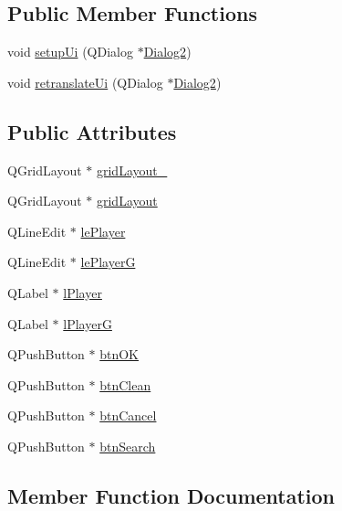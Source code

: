 \subsection*{Public Member Functions}
\begin{DoxyCompactItemize}
\item 
void \hyperlink{class_ui___dialog2_a6844bf81dbbb01d6eb47136862dccaa8}{setup\+Ui} (Q\+Dialog $\ast$\hyperlink{class_dialog2}{Dialog2})
\item 
void \hyperlink{class_ui___dialog2_a26d6371581ce3b88c8814129a6bdc607}{retranslate\+Ui} (Q\+Dialog $\ast$\hyperlink{class_dialog2}{Dialog2})
\end{DoxyCompactItemize}
\subsection*{Public Attributes}
\begin{DoxyCompactItemize}
\item 
Q\+Grid\+Layout $\ast$ \hyperlink{class_ui___dialog2_a42b1df0591a2fb4341a45b336e72a180}{grid\+Layout\+\_}
\item 
Q\+Grid\+Layout $\ast$ \hyperlink{class_ui___dialog2_aadd721d82fa5bcc259b19dffe35ccd54}{grid\+Layout}
\item 
Q\+Line\+Edit $\ast$ \hyperlink{class_ui___dialog2_ad162dcfb64716385a50954e495e7c49d}{le\+Player}
\item 
Q\+Line\+Edit $\ast$ \hyperlink{class_ui___dialog2_a43afbca4fe8ee4a670b656404bc2f48e}{le\+Player\+G}
\item 
Q\+Label $\ast$ \hyperlink{class_ui___dialog2_ae1ec14f69f0c7973147839a3111995d4}{l\+Player}
\item 
Q\+Label $\ast$ \hyperlink{class_ui___dialog2_a82819233e3af6d903c4d2599dd29b83f}{l\+Player\+G}
\item 
Q\+Push\+Button $\ast$ \hyperlink{class_ui___dialog2_ae2f395441fa7b590592adb4559aac10d}{btn\+O\+K}
\item 
Q\+Push\+Button $\ast$ \hyperlink{class_ui___dialog2_a5b84762f1272faea5a7ea2bef366ac28}{btn\+Clean}
\item 
Q\+Push\+Button $\ast$ \hyperlink{class_ui___dialog2_ae564e70ef17efd3c6862c0eb75eb72ca}{btn\+Cancel}
\item 
Q\+Push\+Button $\ast$ \hyperlink{class_ui___dialog2_ad64c2baaea2e0e26e3dfdd1aa1be2dfa}{btn\+Search}
\end{DoxyCompactItemize}


\subsection{Member Function Documentation}
\hypertarget{class_ui___dialog2_a26d6371581ce3b88c8814129a6bdc607}{}

